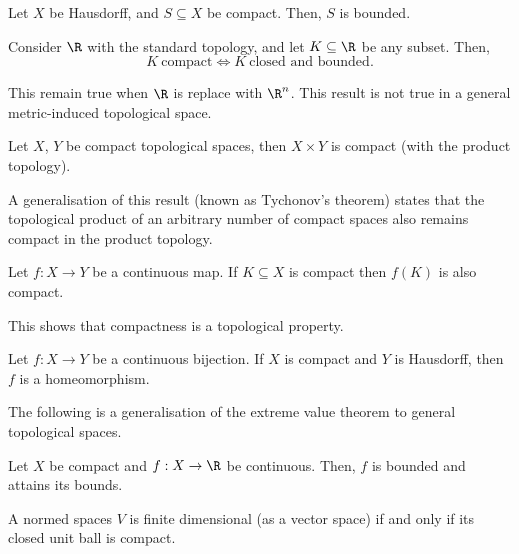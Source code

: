 \begin{nthm}
  Let $X$ be Hausdorff, and $S \subseteq X$ be compact. Then, $S$ is bounded.
\end{nthm}

\begin{nthm}
  Consider $\R$ with the standard topology, and let $K \subseteq \R$ be any subset. Then,
  \begin{equation*}
    K\ \text{compact} \iff K\ \text{closed and bounded}.
  \end{equation*}
\end{nthm}
This remain true when $\R$ is replace with $\R^n$. This result is not true in a general metric-induced topological space.

\begin{nthm}
  Let $X$, $Y$ be compact topological spaces, then $X \times Y$ is compact (with the product topology).
\end{nthm}

A generalisation of this result (known as Tychonov's theorem) states that the topological product of an arbitrary number of compact spaces also remains compact in the product topology.

\begin{nthm}
  Let $f: X \to Y$ be a continuous map. If $K \subseteq X$ is compact then $f(K)$ is also compact.
\end{nthm}
This shows that compactness is a topological property.

\begin{nthm}
  Let $f: X \to Y$ be a continuous bijection. If $X$ is compact and $Y$ is Hausdorff, then $f$ is a homeomorphism.
\end{nthm}

The following is a generalisation of the extreme value theorem to general topological spaces.
\begin{nthm}
  Let $X$ be compact and $f: X \to \R$ be continuous. Then, $f$ is bounded and attains its bounds.
\end{nthm}

\begin{ndfn}
  A normed spaces $V$ is finite dimensional (as a vector space) if and only if its closed unit ball is compact.
\end{ndfn}